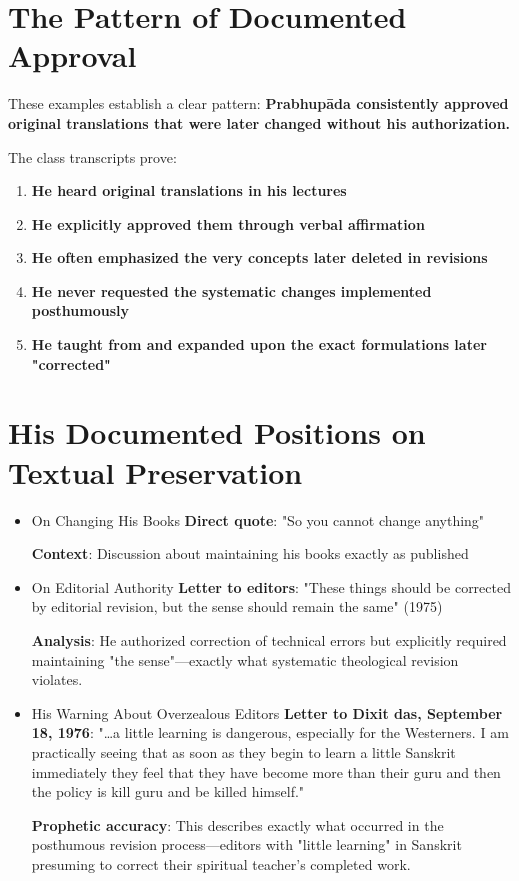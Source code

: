 \documentclass[11pt,twoside]{book}
\begin{document}
\section*{The Pattern of Documented Approval}
\label{sec:org614afcf}

These examples establish a clear pattern: \textbf{\textbf{Prabhupāda consistently approved original translations that were later changed without his authorization.}}

The class transcripts prove:
\begin{enumerate}
\item \textbf{\textbf{He heard original translations in his lectures}}
\item \textbf{\textbf{He explicitly approved them through verbal affirmation}}
\item \textbf{\textbf{He often emphasized the very concepts later deleted in revisions}}
\item \textbf{\textbf{He never requested the systematic changes implemented posthumously}}
\item \textbf{\textbf{He taught from and expanded upon the exact formulations later "corrected"}}
\end{enumerate}
\section*{His Documented Positions on Textual Preservation}
\label{sec:org79c50d3}

\begin{itemize}
\item On Changing His Books
\label{sec:orge1096e1}
\textbf{\textbf{Direct quote}}: "So you cannot change anything"

\textbf{\textbf{Context}}: Discussion about maintaining his books exactly as published
\item On Editorial Authority
\label{sec:org3b0be90}
\textbf{\textbf{Letter to editors}}: "These things should be corrected by editorial revision, but the sense should remain the same" (1975)

\textbf{\textbf{Analysis}}: He authorized correction of technical errors but explicitly required maintaining "the sense"—exactly what systematic theological revision violates.
\item His Warning About Overzealous Editors
\label{sec:orgcd8b643}
\textbf{\textbf{Letter to Dixit das, September 18, 1976}}: "\ldots{}a little learning is dangerous, especially for the Westerners. I am practically seeing that as soon as they begin to learn a little Sanskrit immediately they feel that they have become more than their guru and then the policy is kill guru and be killed himself."

\textbf{\textbf{Prophetic accuracy}}: This describes exactly what occurred in the posthumous revision process—editors with "little learning" in Sanskrit presuming to correct their spiritual teacher's completed work.
\end{itemize}
\end{document}
